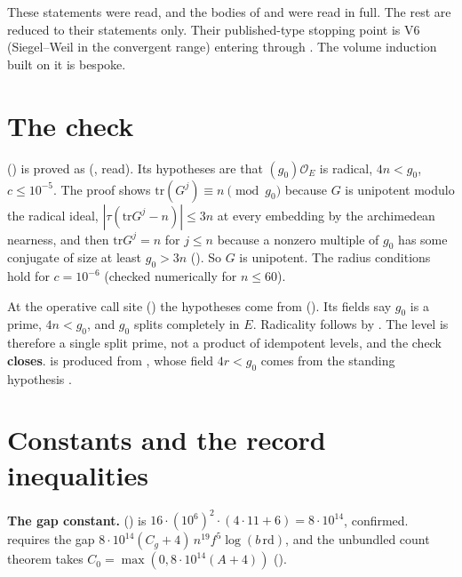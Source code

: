 \documentclass[11pt]{article}
\newcommand{\Ok}{\mathcal O}
\newcommand{\rd}{\mathrm{rd}}
\begin{document}
These statements were read, and the bodies of  and  were read in full. The rest are reduced to their statements only. Their published-type stopping point is V6 (Siegel--Weil in the convergent range) entering through . The volume induction built on it is bespoke.

\section{The  check}

 () is proved as  (, read). Its hypotheses are that $(g_0)\Ok_E$ is radical, $4n<g_0$, $c\le10^{-5}$. The proof shows $\mathrm{tr}(G^j)\equiv n\pmod{g_0}$ because $G$ is unipotent modulo the radical ideal, $|\tau(\mathrm{tr}G^j-n)|\le3n$ at every embedding by the archimedean nearness, and then $\mathrm{tr}G^j=n$ for $j\le n$ because a nonzero multiple of $g_0$ has some conjugate of size at least $g_0>3n$ (). So $G$ is unipotent. The radius conditions hold for $c=10^{-6}$ (checked numerically for $n\le60$).

At the operative call site  () the hypotheses come from  (). Its fields say $g_0$ is a prime, $4n<g_0$, and $g_0$ splits completely in $E$. Radicality follows by . The level is therefore a single split prime, not a product of idempotent levels, and the check \textbf{closes}.  is produced from , whose field $4r<g_0$ comes from the standing hypothesis .

\section{Constants and the record inequalities}\label{sec:rec}

\textbf{The gap constant.}  () is $16\cdot(10^6)^2\cdot(4\cdot11+6)=8\cdot10^{14}$, confirmed.  requires the gap $8\cdot10^{14}(C_g+4)\,n^{19}f^5\log(b\,\rd)$, and the unbundled count theorem takes $C_0=\max(0,8\cdot10^{14}(A+4))$ ().
\end{document}
